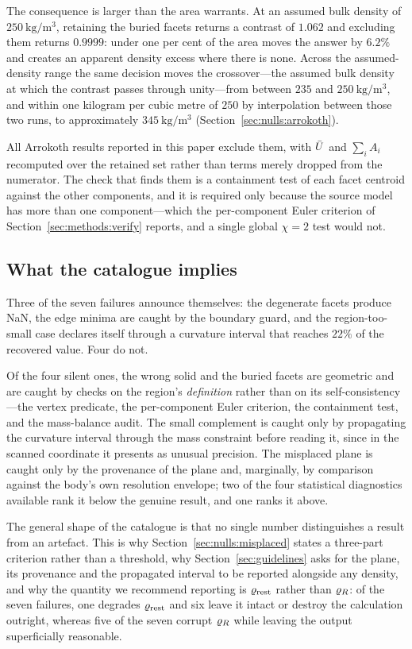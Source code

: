 The consequence is larger than the area warrants. At an assumed bulk
density of $\SI{250}{\kilo\gram\per\cubic\metre}$, retaining the buried
facets returns a contrast of $1.062$ and excluding them returns $0.9999$:
under one per cent of the area moves the answer by $6.2\%$ and creates an
apparent density excess where there is none. Across the assumed-density
range the same decision moves the crossover---the assumed bulk density at
which the contrast passes through unity---from between $235$ and
$\SI{250}{\kilo\gram\per\cubic\metre}$, and within one kilogram per cubic
metre of $250$ by interpolation between those two runs, to approximately
$\SI{345}{\kilo\gram\per\cubic\metre}$
(Section~\ref{sec:nulls:arrokoth}).


All Arrokoth results reported in this paper exclude them, with $\bar{U}$ and
$\sum_i A_i$ recomputed over the retained set rather than terms merely
dropped from the numerator. The check that finds them is a containment
test of each facet centroid against the other components, and it is
required only because the source model has more than one component---which
the per-component Euler criterion of Section~\ref{sec:methods:verify}
reports, and a single global $\chi = 2$ test would not.

\subsection{What the catalogue implies}
\label{sec:failures:summary}

Three of the seven failures announce themselves: the degenerate facets
produce NaN, the edge minima are caught by the boundary guard, and the
region-too-small case declares itself through a curvature interval that
reaches $22\%$ of the recovered value. Four do not.

Of the four silent ones, the wrong solid and the buried facets are
geometric and are caught by checks on the region's \emph{definition}
rather than on its self-consistency---the vertex predicate, the
per-component Euler criterion, the containment test, and the mass-balance
audit. The small complement is caught only by propagating the curvature
interval through the mass constraint before reading it, since in the
scanned coordinate it presents as unusual precision. The misplaced plane
is caught only by the provenance of the plane and, marginally, by
comparison against the body's own resolution envelope; two of the four
statistical diagnostics available rank it below the genuine result, and
one ranks it above.

The general shape of the catalogue is that no single number distinguishes
a result from an artefact. This is why Section~\ref{sec:nulls:misplaced}
states a three-part criterion rather than a threshold, why
Section~\ref{sec:guidelines} asks for the plane, its provenance and the
propagated interval to be reported alongside any density, and why the
quantity we recommend reporting is $\varrho_{\mathrm{rest}}$ rather than $\varrho_{R}$: of
the seven failures, one degrades $\varrho_{\mathrm{rest}}$ and six leave it intact or
destroy the calculation outright, whereas five of the seven corrupt
$\varrho_{R}$ while leaving the output superficially reasonable.
